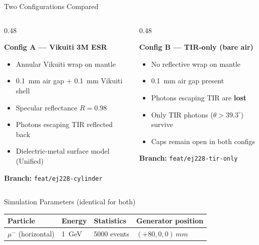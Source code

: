 \documentclass[aspectratio=169,10pt]{beamer}
\begin{document}
\begin{frame}{Two Configurations Compared}

\begin{columns}[T]

  \begin{column}{0.48\textwidth}
  \begin{alertblock}{\textcolor{vikuiti}{\textbf{Config A — Vikuiti 3M ESR}}}
    \begin{itemize}
      \item Annular Vikuiti wrap on mantle
      \item \SI{0.1}{mm} air gap + \SI{0.1}{mm} Vikuiti shell
      \item Specular reflectance $R = 0.98$
      \item Photons escaping TIR reflected back
      \item Dielectric-metal surface model (Unified)
    \end{itemize}
    \vspace{0.3em}
    \textbf{Branch:} \texttt{feat/ej228-cylinder}
  \end{alertblock}
  \end{column}

  \begin{column}{0.48\textwidth}
  \begin{alertblock}{\textcolor{tironly}{\textbf{Config B — TIR-only (bare air)}}}
    \begin{itemize}
      \item No reflective wrap on mantle
      \item \SI{0.1}{mm} air gap present
      \item Photons escaping TIR are \textbf{lost}
      \item Only TIR photons ($\theta > 39.3^\circ$) survive
      \item Caps remain open in both configs
    \end{itemize}
    \vspace{0.3em}
    \textbf{Branch:} \texttt{feat/ej228-tir-only}
  \end{alertblock}
  \end{column}

\end{columns}

\vspace{0.8em}

\begin{block}{Simulation Parameters (identical for both)}
  \centering
  \begin{tabular}{@{}llll@{}}
    \toprule
    Particle & Energy & Statistics & Generator position \\
    \midrule
    $\mu^-$ (horizontal) & \SI{1}{GeV} & 5000 events & $(+80, 0, 0)\,\si{mm}$ \\
    \bottomrule
  \end{tabular}
\end{block}


\end{frame}
\end{document}
